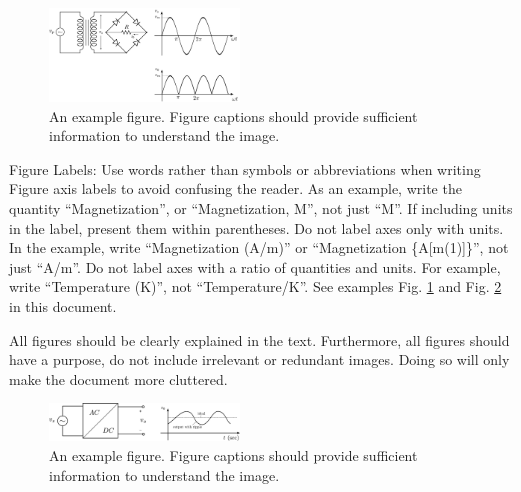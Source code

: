 \begin{figure}
   \centering
   \includegraphics[width = 0.45\textwidth]{figures/21.pdf}
   \caption{An example figure. Figure captions should provide sufficient information to understand the image.}
   \label{fig:mySampleFigure}
\end{figure}


Figure Labels: Use words rather than symbols or abbreviations when writing Figure axis labels to avoid confusing the reader. As an example, write the quantity ``Magnetization'', or ``Magnetization, M'', not just ``M''. If including units in the label, present them within parentheses. Do not label axes only with units. In the example, write ``Magnetization (A/m)'' or ``Magnetization \{A[m(1)]\}'', not just ``A/m''. Do not label axes with a ratio of quantities and units. For example, write ``Temperature (K)'', not ``Temperature/K''. See examples Fig. \ref{fig:mySampleFigure} and Fig. \ref{fig:myOtherSampleFigure} in this document.

All figures should be clearly explained in the text. Furthermore, all figures should have a purpose, do not include irrelevant or redundant images. Doing so will only make the document more cluttered.



\begin{figure}[H]
    \centering
	\includegraphics[width = 0.45\textwidth]{figures/19.pdf}
	\caption{An example figure. Figure captions should provide sufficient information to understand the image.}
    \label{fig:myOtherSampleFigure}
\end{figure}











